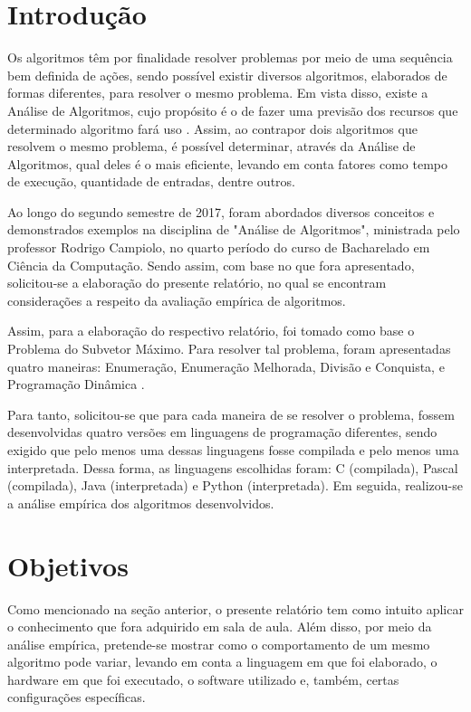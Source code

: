 \documentclass[
	12pt,				%
	oneside,   	        %
	a4paper,			%
	english,			%
	french,				%
	spanish,			%
	brazil,				%
	]{pacotes/abntex2}
\begin{document}
\textual

\makeatletter
\renewcommand{\chapter}{\@gobbletwo}
\makeatother

\section{Introdução}
\label{sec:introducao}
    Os algoritmos têm por finalidade resolver problemas por meio de uma sequência bem definida de ações, sendo possível existir diversos algoritmos, elaborados de formas diferentes, para resolver o mesmo problema. Em vista disso, existe a Análise de Algoritmos, cujo propósito é o de fazer uma previsão dos recursos que determinado algoritmo fará uso \cite{art5}. Assim, ao contrapor dois algoritmos que resolvem o mesmo problema, é possível determinar, através da Análise de Algoritmos, qual deles é o mais eficiente, levando em conta fatores como tempo de execução, quantidade de entradas, dentre outros.
    
    Ao longo do segundo semestre de 2017, foram abordados diversos conceitos e demonstrados exemplos na disciplina de "Análise de Algoritmos", ministrada pelo professor Rodrigo Campiolo, no quarto período do curso de Bacharelado em Ciência da Computação. Sendo assim, com base no que fora apresentado, solicitou-se a elaboração do presente relatório, no qual se encontram considerações a respeito da avaliação empírica de algoritmos.
    
    Assim, para a elaboração do respectivo relatório, foi tomado como base o Problema do Subvetor Máximo. Para resolver tal problema, foram apresentadas quatro maneiras: Enumeração, Enumeração Melhorada, Divisão e Conquista, e Programação Dinâmica \cite{art6}.
    
    Para tanto, solicitou-se que para cada maneira de se resolver o problema, fossem desenvolvidas quatro versões em linguagens de programação diferentes, sendo exigido que pelo menos uma dessas linguagens fosse compilada e pelo menos uma interpretada. Dessa forma, as linguagens escolhidas foram: C (compilada), Pascal (compilada), Java (interpretada) e Python (interpretada). Em seguida, realizou-se a análise empírica dos algoritmos desenvolvidos.

\section{Objetivos}
\label{sec:objetivos}
    Como mencionado na seção anterior, o presente relatório tem como intuito aplicar o conhecimento que fora adquirido em sala de aula. Além disso, por meio da análise empírica, pretende-se mostrar como o comportamento de um mesmo algoritmo pode variar, levando em conta a linguagem em que foi elaborado, o hardware em que foi executado, o software utilizado e, também, certas configurações específicas. 
\end{document}
